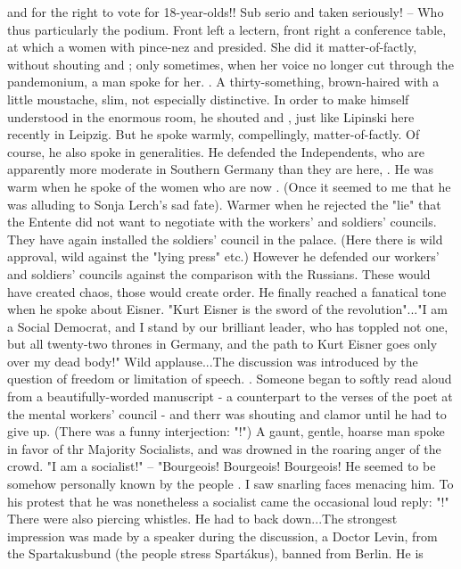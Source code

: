  and for the right to vote for 18-year-olds!! Sub serio and taken seriously! -- Who thus particularly  the podium. Front left a lectern, front right a conference table, at which a women with pince-nez and  presided. She did it matter-of-factly, without shouting and ; only sometimes, when her voice no longer cut through the pandemonium, a man spoke for her. . A thirty-something, brown-haired with a little moustache, slim, not especially distinctive.
In order to make himself understood in the enormous room, he shouted and , just like Lipinski here recently in Leipzig. But he spoke warmly, compellingly, matter-of-factly. Of course, he also spoke in generalities. He defended the Independents, who are apparently more moderate in Southern Germany than they are here, . He was warm when he spoke of the women who are now . (Once it seemed to me that he was alluding to Sonja Lerch's sad fate). Warmer when he rejected the "lie" that the Entente did not want to negotiate with the workers' and soldiers' councils. They have again installed the soldiers' council in the palace. (Here there is wild approval, wild  against the "lying press" etc.) However he defended our workers' and soldiers' councils against the comparison with the Russians. These would have created chaos, those would create order. He finally reached a fanatical tone when he spoke about Eisner. "Kurt Eisner is the sword of the revolution"..."I am a Social Democrat, and I stand by our brilliant leader, who has toppled not one, but all twenty-two thrones in Germany, and the path to Kurt Eisner goes only over my dead body!" Wild applause...The discussion was introduced by the question of freedom or limitation of speech. . Someone began to softly read aloud from a beautifully-worded manuscript - a counterpart to the verses of the poet at the mental workers' council - and therr was shouting and clamor until he had to give up. (There was a funny interjection: "!") A gaunt, gentle, hoarse man spoke in favor of thr Majority Socialists, and was drowned in the roaring anger of the crowd. "I am a socialist!" -- "Bourgeois! Bourgeois! Bourgeois! He seemed to be somehow personally known by the people . I saw snarling faces menacing him. To his protest that he was nonetheless a socialist came the occasional loud reply: "!" There were also piercing whistles. He had to back down...The strongest impression was made by a speaker during the discussion, a Doctor Levin, from the Spartakusbund (the people stress Spartákus), banned from Berlin. He is 